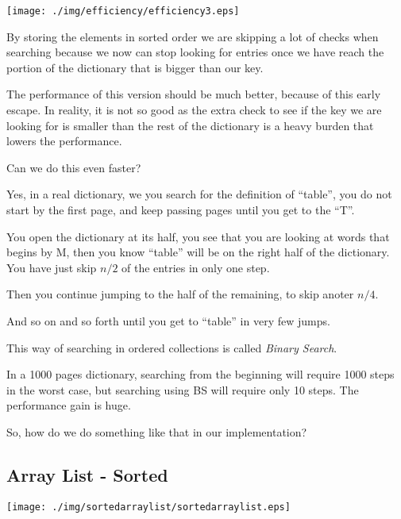 \documentclass[a4paper, 9pt]{extarticle}
\begin{document}
\begin{multicols}{2}
\begin{center}
  \texttt{[image: ./img/efficiency/efficiency3.eps]}
\end{center}
\columnbreak

By storing the elements in sorted order we are skipping a lot of checks when
searching because we now can stop looking for entries once we have reach the
portion of the dictionary that is bigger than our key.

The performance of this version should be much better, because of this early
escape. In reality, it is not so good as the extra check to see if the key we
are looking for is smaller than the rest of the dictionary is a heavy burden
that lowers the performance.

Can we do this even faster?

Yes, in a real dictionary, we you search for the definition of ``table'', you
do not start by the first page, and keep passing pages until you get to the
``T''.

You open the dictionary at its half, you see that you are looking at words that
begins by M, then you know ``table'' will be on the right half of the
dictionary. You have just skip $n/2$ of the entries in only one step.

Then you continue jumping to the half of the remaining, to skip anoter $n/4$.

And so on and so forth until you get to ``table'' in very few jumps.

This way of searching in ordered collections is called \emph{Binary Search}.

In a 1000 pages dictionary, searching from the beginning will require 1000
steps in the worst case, but searching using BS will require only 10 steps. The
performance gain is huge.

So, how do we do something like that in our implementation?
\end{multicols}



\newpage

\subsection{Array List - Sorted}

\begin{center}
  \texttt{[image: ./img/sortedarraylist/sortedarraylist.eps]}
\end{center}
\end{document}
